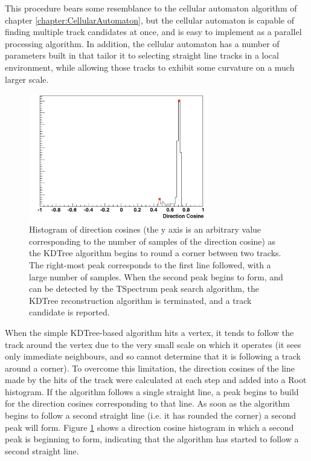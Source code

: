 This procedure bears some resemblance to the cellular automaton algorithm of chapter \ref{chapter:CellularAutomaton}, but the cellular automaton is capable of finding multiple track candidates at once, and is easy to implement as a parallel processing algorithm. In addition, the cellular automaton has a number of parameters built in that tailor it to selecting straight line tracks in a local environment, while allowing those tracks to exhibit some curvature on a much larger scale.

\begin{figure}
    \centering
    \includegraphics[width=0.7\textwidth]{chapters/otheralg_images/kdtree-peaks}
    \caption[Direction cosines around a corner between two tracks]{\label{fig:kdtree_peaks}Histogram of direction cosines (the y axis is an arbitrary value corresponding to the number of samples of the direction cosine) as the KDTree algorithm begins to round a corner between two tracks. The right-most peak corresponds to the first line followed, with a large number of samples. When the second peak begins to form, and can be detected by the TSpectrum peak search algorithm, the KDTree reconstruction algorithm is terminated, and a track candidate is reported.}
\end{figure}

When the simple KDTree-based algorithm hits a vertex, it tends to follow the track around the vertex due to the very small scale on which it operates (it sees only immediate neighbours, and so cannot determine that it is following a track around a corner). To overcome this limitation, the direction cosines of the line made by the hits of the track were calculated at each step and added into a {\sc Root} histogram. If the algorithm follows a single straight line, a peak begins to build for the direction cosines corresponding to that line. As soon as the algorithm begins to follow a second straight line (i.e. it has rounded the corner) a second peak will form. Figure \ref{fig:kdtree_peaks} shows a direction cosine histogram in which a second peak is beginning to form, indicating that the algorithm has started to follow a second straight line.

